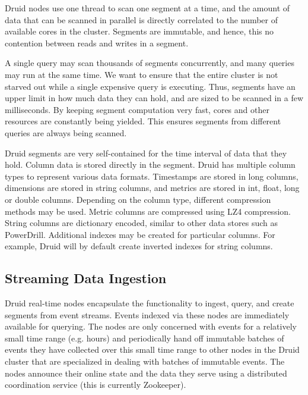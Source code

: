 \documentclass{vldb}
\begin{document}
Druid nodes use one thread to scan one segment at a time, and the amount of
data that can be scanned in parallel is directly correlated to the number of
available cores in the cluster. Segments are immutable, and hence, this no
contention between reads and writes in a segment.

A single query may scan thousands of segments concurrently, and
many queries may run at the same time. We want to ensure that the entire
cluster is not starved out while a single expensive query is executing. Thus,
segments have an upper limit in how much data they can hold, and are sized
to be scanned in a few milliseconds. By keeping segment computation very fast,
cores and other resources are constantly being yielded. This ensures segments
from different queries are always being scanned.

Druid segments are very self-contained for the time interval of data that they
hold. Column data is stored directly in the segment. Druid has multiple column
types to represent various data formats. Timestamps are stored in long columns,
dimensions are stored in string columns, and metrics are stored in int, float,
long or double columns. Depending on the column type, different compression
methods may be used. Metric columns are compressed using
LZ4\cite{collet2013lz4} compression. String columns are dictionary encoded,
similar to other data stores such as PowerDrill\cite{hall2012processing}.
Additional indexes may be created for particular columns. For example, Druid
will by default create inverted indexes for string columns.

\subsection{Streaming Data Ingestion}
Druid real-time nodes encapsulate the functionality to ingest, query, and create
segments from event streams. Events indexed via these nodes are immediately
available for querying.  The nodes are only concerned with events for a relatively
small time range (e.g. hours) and periodically hand off immutable batches of events they
have collected over this small time range to other nodes in the Druid cluster
that are specialized in dealing with batches of immutable events. The nodes
announce their online state and the data they serve using a distributed
coordination service (this is currently Zookeeper\cite{hunt2010zookeeper}).
\end{document}
